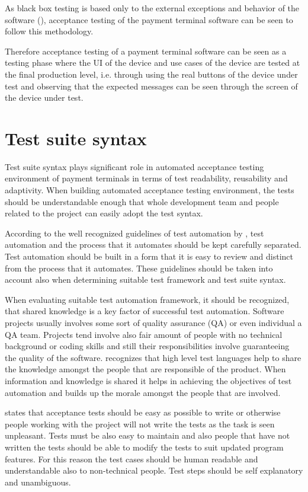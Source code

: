 As black box testing is based only to the external exceptions and behavior of the software (\emph{\cite{khan2012comparative}}), acceptance testing of the payment terminal software can be seen to follow this methodology.

Therefore acceptance testing of a payment terminal software can be seen as a testing phase where the UI of the device and use cases of the device are tested at the final production level, i.e. through using the real buttons of the device under test and observing that the expected messages can be seen through the screen of the device under test.

\section{Test suite syntax}

Test suite syntax plays significant role in automated acceptance testing environment of payment terminals in terms of test readability, reusability and adaptivity. When building automated acceptance testing environment, the tests should be understandable enough that whole development team and people related to the project can easily adopt the test syntax.

According to the well recognized guidelines of test automation by \emph{\cite{snakeoil}}, test automation and the process that it automates should be kept carefully separated. Test automation should be built in a form that it is easy to review and distinct from the process that it automates. These guidelines should be taken into account also when determining suitable test framework and test suite syntax.

When evaluating suitable test automation framework, it should be recognized, that shared knowledge is a key factor of successful test automation. Software projects usually involves some sort of quality assurance (QA) or even individual a QA team. Projects tend involve also fair amount of people with no technical background or coding skills and still their responsibilities involve guaranteeing the quality of the software. \emph{\cite{just_enough}} recognizes that high level test languages help to share the knowledge amongst the people that are responsible of the product. When information and knowledge is shared it helps in achieving the objectives of test automation and builds up the morale amongst the people that are involved.

\emph{\cite{lowell2003successful}} states that acceptance tests should be easy as possible to write or otherwise people working with the project will not write the tests as the task is seen unpleasant. Tests must be also easy to maintain and also people that have not written the tests should be able to modify the tests to suit updated program features. For this reason the test cases should be human readable and understandable also to non-technical people. Test steps should be self explanatory and unambiguous.

